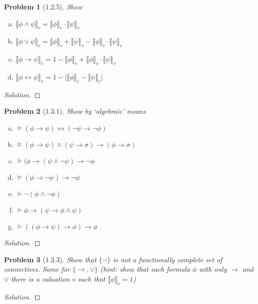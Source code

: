 \documentclass[letter]{article}
\newtheorem{problem}{Problem}
\theoremstyle{definition}
\newenvironment{solution}
{\begin{proof}[Solution]}
	{\end{proof}}
\begin{document}
 
\newcommand{\den}[1]{\llbracket #1 \rrbracket_v}
\begin{problem}[1.2.5]
    Show
 \begin{enumerate}[(a)]
     \item $\den{\phi \land \psi} = \den{\phi} \cdot \den{\psi}$
     \item $\den{\phi \lor \psi} = \den{\phi} + \den{\psi} - \den{\phi} \cdot \den\psi$
     \item $\den{\phi \to \psi} = 1 - \den{\phi} + \den{\phi} \cdot \den{\psi}$
     \item $\den{\phi \leftrightarrow \psi} = 1 - \big|
     \den{\phi} - \den{\psi} \big|$
 \end{enumerate}
\end{problem}
\begin{solution}
    
\end{solution}

\begin{problem}[1.3.1] Show by `algebraic' means
 \begin{enumerate}[(a)]
     \item $\models (\phi \to \psi) \leftrightarrow (\neg \psi \to \neg \phi)$
     \item $\models (\phi \to \psi) \land (\psi \to \sigma) \to (\phi \to \sigma)$
     \item $\models (\phi \to (\psi \land \neg \psi) \to \neg \phi$
     \item $\models (\phi \to \neg \psi) \to \neg \phi$
     \item $\models \neg (\phi \land \neg \phi)$
     \item $\models \phi \to (\psi \to \phi \land \psi)$
     \item $\models ((\phi \to \psi) \to \phi) \to \phi$
 \end{enumerate}
\end{problem}
\begin{solution}
\end{solution}

\begin{problem}[1.3.3] Show that $\{ \neg \}$ is not a functionally complete set of connectives. Same for $\{\to, \lor\}$ (hint: show that each formula $\phi$ with only $\to$ and $\lor$ there is a valuation v such that $\llbracket \phi \rrbracket_v = 1$)
\end{problem}
\begin{solution}
\end{solution}
\end{document}
